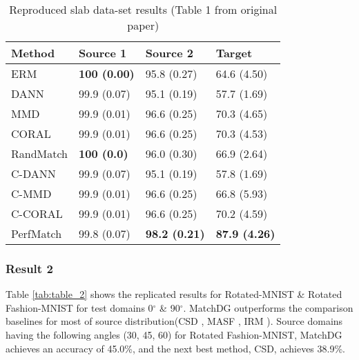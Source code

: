 \begin{table}[h]
\centering
\caption{\label{tab:table_1}Reproduced slab data-set results (Table 1 from original paper)}
\begin{tabular}{l|ll|l}
\hline
Method    & Source 1            & Source 2    & Target      \\ \hline
ERM       & \textbf{100 (0.00)} & 95.8 (0.27) & 64.6 (4.50) \\
DANN      & 99.9 (0.07)         & 95.1 (0.19) & 57.7 (1.69) \\
MMD       & 99.9 (0.01)         & 96.6 (0.25) & 70.3 (4.65) \\
CORAL     & 99.9 (0.01)         & 96.6 (0.25) & 70.3 (4.53) \\ \hline
RandMatch & \textbf{100 (0.0)}  & 96.0 (0.30) & 66.9 (2.64) \\
C-DANN    & 99.9 (0.07)         & 95.1 (0.19) & 57.8 (1.69) \\
C-MMD     & 99.9 (0.01)         & 96.6 (0.25) & 66.8 (5.93) \\
C-CORAL   & 99.9 (0.01)         & 96.6 (0.25) & 70.2 (4.59) \\ \hline
PerfMatch & 99.8 (0.07)         & \textbf{98.2 (0.21)} & \textbf{87.9 (4.26)} \\ \hline
\end{tabular}
\end{table}

\subsubsection{Result 2}

Table \ref{tab:table_2} shows the replicated results for Rotated-MNIST \& Rotated Fashion-MNIST for test domains 0$^{\circ}$ \& 90$^{\circ}$. MatchDG outperforms the comparison baselines for most of source distribution(CSD \cite{piratla2020efficient}, MASF \cite{dou2019domain}, IRM \cite{irm}). Source domains having the following angles (30, 45, 60) for Rotated Fashion-MNIST, MatchDG achieves an accuracy of 45.0\%, and the next best method, CSD, achieves 38.9\%. 


